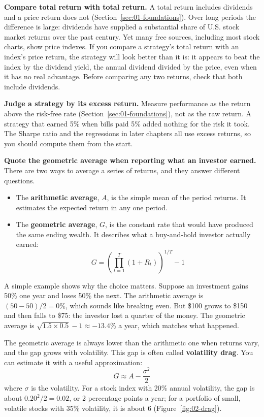 \textbf{Compare total return with total return.} A total return includes
dividends and a price return does not (Section~\ref{sec:01-foundations}). Over
long periods the difference is large: dividends have supplied a substantial
share of U.S. stock market returns over the past century. Yet many free
sources, including most stock charts, show price indexes. If you compare a
strategy's total return with an index's price return, the strategy will look
better than it is: it appears to beat the index by the dividend yield, the
annual dividend divided by the price, even when it has no real advantage.
Before comparing any two returns, check that both include dividends.

\textbf{Judge a strategy by its excess return.} Measure performance as the
return above the risk-free rate (Section~\ref{sec:01-foundations}), not as the
raw return. A strategy that earned 5\% when bills paid 5\% added nothing for
the risk it took. The Sharpe ratio and the regressions in later chapters all
use excess returns, so you should compute them from the start.

\textbf{Quote the geometric average when reporting what an investor earned.}
There are two ways to average a series of returns, and they answer different
questions.

\begin{itemize}
  \item The \textbf{arithmetic average}, $A$, is the simple mean of the period returns. It estimates the expected return in any one period.
  \item The \textbf{geometric average}, $G$, is the constant rate that would have produced the same ending wealth. It describes what a buy-and-hold investor actually earned:
  \begin{equation}
    G = \left(\prod_{t=1}^{T} (1 + R_t)\right)^{1/T} - 1
    \label{eq:02-geometric}
  \end{equation}
\end{itemize}

A simple example shows why the choice matters. Suppose an investment gains 50\%
one year and loses 50\% the next. The arithmetic average is $(50 - 50)/2 = 0$\%,
which sounds like breaking even. But \$100 grows to \$150 and then falls to
\$75: the investor lost a quarter of the money. The geometric average is
$\sqrt{1.5 \times 0.5} - 1 \approx -13.4$\% a year, which matches what happened.

The geometric average is always lower than the arithmetic one when returns
vary, and the gap grows with volatility. This gap is often called
\textbf{volatility drag}. You can estimate it with a useful approximation:
\begin{equation}
  G \approx A - \frac{\sigma^2}{2}
  \label{eq:02-drag}
\end{equation}
where $\sigma$ is the volatility. For a stock index with 20\% annual volatility,
the gap is about $0.20^2/2 = 0.02$, or 2 percentage points a year; for a
portfolio of small, volatile stocks with 35\% volatility, it is about 6
(Figure~\ref{fig:02-drag}).

